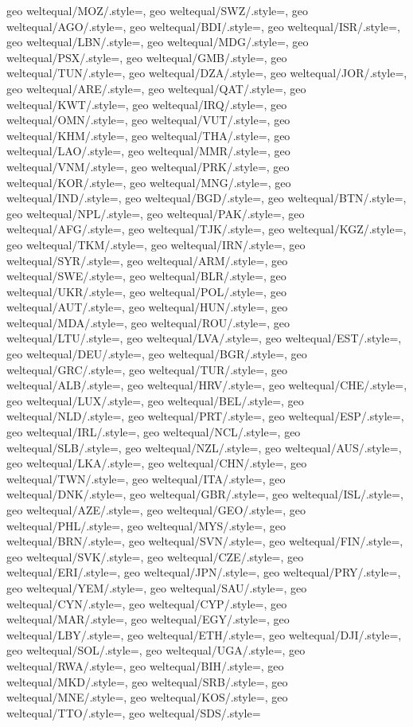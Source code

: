 {  geo weltequal/MOZ/.style={},
  geo weltequal/SWZ/.style={},
  geo weltequal/AGO/.style={},
  geo weltequal/BDI/.style={},
  geo weltequal/ISR/.style={},
  geo weltequal/LBN/.style={},
  geo weltequal/MDG/.style={},
  geo weltequal/PSX/.style={},
  geo weltequal/GMB/.style={},
  geo weltequal/TUN/.style={},
  geo weltequal/DZA/.style={},
  geo weltequal/JOR/.style={},
  geo weltequal/ARE/.style={},
  geo weltequal/QAT/.style={},
  geo weltequal/KWT/.style={},
  geo weltequal/IRQ/.style={},
  geo weltequal/OMN/.style={},
  geo weltequal/VUT/.style={},
  geo weltequal/KHM/.style={},
  geo weltequal/THA/.style={},
  geo weltequal/LAO/.style={},
  geo weltequal/MMR/.style={},
  geo weltequal/VNM/.style={},
  geo weltequal/PRK/.style={},
  geo weltequal/KOR/.style={},
  geo weltequal/MNG/.style={},
  geo weltequal/IND/.style={},
  geo weltequal/BGD/.style={},
  geo weltequal/BTN/.style={},
  geo weltequal/NPL/.style={},
  geo weltequal/PAK/.style={},
  geo weltequal/AFG/.style={},
  geo weltequal/TJK/.style={},
  geo weltequal/KGZ/.style={},
  geo weltequal/TKM/.style={},
  geo weltequal/IRN/.style={},
  geo weltequal/SYR/.style={},
  geo weltequal/ARM/.style={},
  geo weltequal/SWE/.style={},
  geo weltequal/BLR/.style={},
  geo weltequal/UKR/.style={},
  geo weltequal/POL/.style={},
  geo weltequal/AUT/.style={},
  geo weltequal/HUN/.style={},
  geo weltequal/MDA/.style={},
  geo weltequal/ROU/.style={},
  geo weltequal/LTU/.style={},
  geo weltequal/LVA/.style={},
  geo weltequal/EST/.style={},
  geo weltequal/DEU/.style={},
  geo weltequal/BGR/.style={},
  geo weltequal/GRC/.style={},
  geo weltequal/TUR/.style={},
  geo weltequal/ALB/.style={},
  geo weltequal/HRV/.style={},
  geo weltequal/CHE/.style={},
  geo weltequal/LUX/.style={},
  geo weltequal/BEL/.style={},
  geo weltequal/NLD/.style={},
  geo weltequal/PRT/.style={},
  geo weltequal/ESP/.style={},
  geo weltequal/IRL/.style={},
  geo weltequal/NCL/.style={},
  geo weltequal/SLB/.style={},
  geo weltequal/NZL/.style={},
  geo weltequal/AUS/.style={},
  geo weltequal/LKA/.style={},
  geo weltequal/CHN/.style={},
  geo weltequal/TWN/.style={},
  geo weltequal/ITA/.style={},
  geo weltequal/DNK/.style={},
  geo weltequal/GBR/.style={},
  geo weltequal/ISL/.style={},
  geo weltequal/AZE/.style={},
  geo weltequal/GEO/.style={},
  geo weltequal/PHL/.style={},
  geo weltequal/MYS/.style={},
  geo weltequal/BRN/.style={},
  geo weltequal/SVN/.style={},
  geo weltequal/FIN/.style={},
  geo weltequal/SVK/.style={},
  geo weltequal/CZE/.style={},
  geo weltequal/ERI/.style={},
  geo weltequal/JPN/.style={},
  geo weltequal/PRY/.style={},
  geo weltequal/YEM/.style={},
  geo weltequal/SAU/.style={},
  geo weltequal/CYN/.style={},
  geo weltequal/CYP/.style={},
  geo weltequal/MAR/.style={},
  geo weltequal/EGY/.style={},
  geo weltequal/LBY/.style={},
  geo weltequal/ETH/.style={},
  geo weltequal/DJI/.style={},
  geo weltequal/SOL/.style={},
  geo weltequal/UGA/.style={},
  geo weltequal/RWA/.style={},
  geo weltequal/BIH/.style={},
  geo weltequal/MKD/.style={},
  geo weltequal/SRB/.style={},
  geo weltequal/MNE/.style={},
  geo weltequal/KOS/.style={},
  geo weltequal/TTO/.style={},
  geo weltequal/SDS/.style={}}
